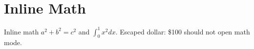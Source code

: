 \section{Inline Math}
Inline math $a^2 + b^2 = c^2$ and \( \int_0^1 x^2 dx \).
Escaped dollar: \$100 should not open math mode.
